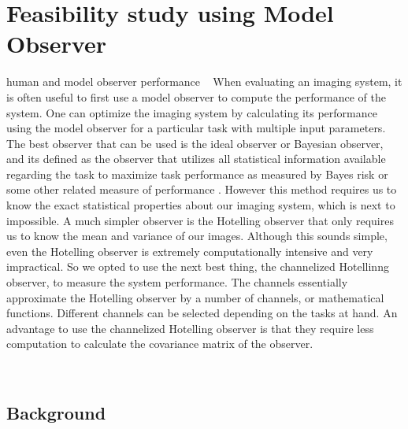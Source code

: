 \chapter{Feasibility study using Model Observer}
human and model observer performance ~\cite{Abbey2001}
When evaluating an imaging system, it is often useful to first use a model observer to compute the performance of the system.  One can optimize the imaging system by calculating its performance using the model observer for a particular task with multiple input parameters.  The best observer that can be used is the ideal observer or Bayesian observer, and its defined as the observer that utilizes all statistical information available regarding the task to maximize task performance as measured by Bayes risk or some other related measure of performance \citep{Barrett2004}.  However this method requires us to know the exact statistical properties about our imaging system, which is next to impossible.  A much simpler observer is the Hotelling observer that only requires us to know the mean and variance of our images.  Although this sounds simple, even the Hotelling observer is extremely computationally intensive and very impractical.  So we opted to use the next best thing, the channelized Hotellinng observer,  to measure the system performance.  
The channels essentially approximate the Hotelling observer by a number of channels, or mathematical functions.  Different channels can be selected depending on the tasks at hand.  An advantage to use the channelized Hotelling observer is that they require less computation to calculate the covariance matrix of the observer.

~\cite{Fan2010}
\citep{Barrett2004}

\section{Background}

